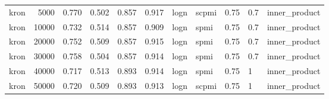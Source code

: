 \begin{tabular}{lrrrrrlllll}
    kron &            5000 &  0.770 &  0.502 &      0.857 &          0.917 &  logn &  scpmi &    0.75 &  0.7 &  inner\_product \\
    kron &           10000 &  0.732 &  0.514 &      0.857 &          0.909 &  logn &   spmi &    0.75 &  0.7 &  inner\_product \\
    kron &           20000 &  0.752 &  0.509 &      0.857 &          0.915 &  logn &   spmi &    0.75 &  0.7 &  inner\_product \\
    kron &           30000 &  0.758 &  0.504 &      0.857 &          0.914 &  logn &   spmi &    0.75 &  0.7 &  inner\_product \\
    kron &           40000 &  0.717 &  0.513 &      0.893 &          0.914 &  logn &   spmi &    0.75 &    1 &  inner\_product \\
    kron &           50000 &  0.720 &  0.509 &      0.893 &          0.913 &  logn &  scpmi &    0.75 &    1 &  inner\_product \\
\bottomrule
\end{tabular}
